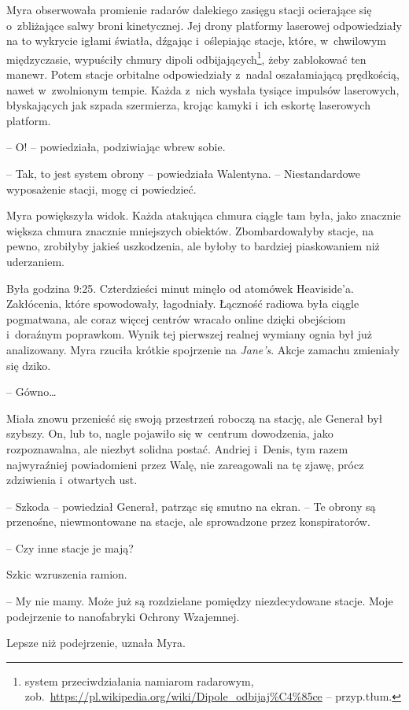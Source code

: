 \documentclass[oneside,polish,11pt,sfheadings]{mwbk}
\begin{document}
Myra obserwowała promienie radarów dalekiego zasięgu stacji ocierające
się o~zbliżające salwy broni kinetycznej. Jej drony platformy laserowej
odpowiedziały na to wykrycie igłami światła, dźgając i~oślepiając
stacje, które, w~chwilowym międzyczasie, wypuściły chmury dipoli
odbijających\footnote{ system przeciwdziałania namiarom radarowym,
zob.~\url{https://pl.wikipedia.org/wiki/Dipole\_odbijaj\%C4\%85ce}
-- przyp.tłum.}, żeby zablokować ten manewr. Potem stacje orbitalne
odpowiedziały z~nadal oszałamiającą prędkością, nawet w~zwolnionym
tempie. Każda z~nich wysłała tysiące impulsów laserowych, błyskających
jak szpada szermierza, krojąc kamyki i~ich eskortę laserowych platform.

-- O! -- powiedziała, podziwiając wbrew sobie.

-- Tak, to jest system obrony -- powiedziała Walentyna. -- Niestandardowe
wyposażenie stacji, mogę ci powiedzieć.

Myra powiększyła widok. Każda atakująca chmura ciągle tam była, jako
znacznie większa chmura znacznie mniejszych obiektów. Zbombardowałyby
stacje, na pewno, zrobiłyby jakieś uszkodzenia, ale byłoby to bardziej
piaskowaniem niż uderzaniem.

Była godzina 9:25. Czterdzieści minut minęło od atomówek Heaviside'a.
Zakłócenia, które spowodowały, łagodniały. Łączność radiowa była ciągle
pogmatwana, ale coraz więcej centrów wracało online dzięki obejściom i~doraźnym poprawkom. Wynik tej pierwszej realnej wymiany ognia był już
analizowany. Myra rzuciła krótkie spojrzenie na \textit{Jane's}. Akcje
zamachu zmieniały się dziko.

-- Gówno\ldots

Miała znowu przenieść się swoją przestrzeń roboczą na stację, ale
Generał był szybszy. On, lub to, nagle pojawiło się w~centrum
dowodzenia, jako rozpoznawalna, ale niezbyt solidna postać. Andriej i~Denis, tym razem najwyraźniej powiadomieni przez Walę, nie zareagowali
na tę zjawę, prócz zdziwienia i~otwartych ust.

-- Szkoda -- powiedział Generał, patrząc się smutno na ekran. -- Te obrony
są przenośne, niewmontowane na stacje, ale sprowadzone przez
konspiratorów.

-- Czy inne stacje je mają?

Szkic wzruszenia ramion. 

-- My nie mamy. Może już są rozdzielane pomiędzy
niezdecydowane stacje. Moje podejrzenie to nanofabryki Ochrony
Wzajemnej.

Lepsze niż podejrzenie, uznała Myra.
\end{document}

